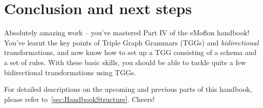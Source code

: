 \chapter{Conclusion and next steps}
\genHeader

\vspace{0.5cm}

Absolutely amazing work -- you've mastered Part IV of the eMoflon handbook! You've learnt the key points of Triple Graph Grammars (TGGs) and \emph{bidirectional} transformations, and now know how to set up a TGG consisting of a schema and a set of rules. 
With these basic skills, you should be able to tackle quite a few bidirectional transformations using TGGs.

For detailed descriptions on the upcoming and previous parts of this handbook, please refer to~\cref{sec:HandbookStructure}.
Cheers!